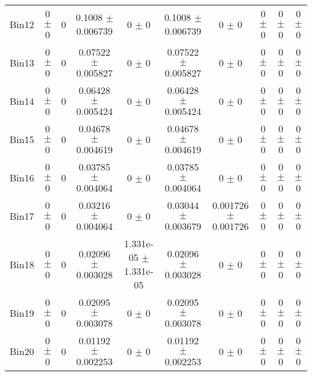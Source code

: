 \begin{tabular}{@{\extracolsep{4pt}}lccccccccc@{}}
     Bin12 & 0 $\pm$ 0 & 0 & 0.1008 $\pm$ 0.006739 & 0 $\pm$ 0 & 0.1008 $\pm$ 0.006739 & 0 $\pm$ 0 & 0 $\pm$ 0 & 0 $\pm$ 0 & 0 $\pm$ 0 \\ 
     Bin13 & 0 $\pm$ 0 & 0 & 0.07522 $\pm$ 0.005827 & 0 $\pm$ 0 & 0.07522 $\pm$ 0.005827 & 0 $\pm$ 0 & 0 $\pm$ 0 & 0 $\pm$ 0 & 0 $\pm$ 0 \\ 
     Bin14 & 0 $\pm$ 0 & 0 & 0.06428 $\pm$ 0.005424 & 0 $\pm$ 0 & 0.06428 $\pm$ 0.005424 & 0 $\pm$ 0 & 0 $\pm$ 0 & 0 $\pm$ 0 & 0 $\pm$ 0 \\ 
     Bin15 & 0 $\pm$ 0 & 0 & 0.04678 $\pm$ 0.004619 & 0 $\pm$ 0 & 0.04678 $\pm$ 0.004619 & 0 $\pm$ 0 & 0 $\pm$ 0 & 0 $\pm$ 0 & 0 $\pm$ 0 \\ 
     Bin16 & 0 $\pm$ 0 & 0 & 0.03785 $\pm$ 0.004064 & 0 $\pm$ 0 & 0.03785 $\pm$ 0.004064 & 0 $\pm$ 0 & 0 $\pm$ 0 & 0 $\pm$ 0 & 0 $\pm$ 0 \\ 
     Bin17 & 0 $\pm$ 0 & 0 & 0.03216 $\pm$ 0.004064 & 0 $\pm$ 0 & 0.03044 $\pm$ 0.003679 & 0.001726 $\pm$ 0.001726 & 0 $\pm$ 0 & 0 $\pm$ 0 & 0 $\pm$ 0 \\ 
     Bin18 & 0 $\pm$ 0 & 0 & 0.02096 $\pm$ 0.003028 & 1.331e-05 $\pm$ 1.331e-05 & 0.02096 $\pm$ 0.003028 & 0 $\pm$ 0 & 0 $\pm$ 0 & 0 $\pm$ 0 & 0 $\pm$ 0 \\ 
     Bin19 & 0 $\pm$ 0 & 0 & 0.02095 $\pm$ 0.003078 & 0 $\pm$ 0 & 0.02095 $\pm$ 0.003078 & 0 $\pm$ 0 & 0 $\pm$ 0 & 0 $\pm$ 0 & 0 $\pm$ 0 \\ 
     Bin20 & 0 $\pm$ 0 & 0 & 0.01192 $\pm$ 0.002253 & 0 $\pm$ 0 & 0.01192 $\pm$ 0.002253 & 0 $\pm$ 0 & 0 $\pm$ 0 & 0 $\pm$ 0 & 0 $\pm$ 0 \\ 
\hline\hline
  \end{tabular}
